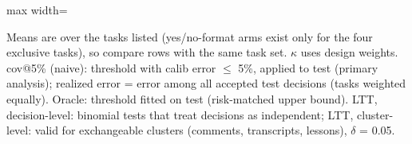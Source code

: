 \begin{table}[t]
\begin{adjustbox}{max width=\linewidth}
\end{adjustbox}
\par\smallskip\footnotesize\raggedright Means are over the tasks listed (yes/no-format arms exist only for the four exclusive tasks), so compare rows with the same task set. $\kappa$ uses design weights. cov@5\% (naive): threshold with calib error $\leq$ 5\%, applied to test (primary analysis); realized error = error among all accepted test decisions (tasks weighted equally). Oracle: threshold fitted on test (risk-matched upper bound). LTT, decision-level: binomial tests that treat decisions as independent; LTT, cluster-level: valid for exchangeable clusters (comments, transcripts, lessons), $\delta$ = 0.05.
\end{table}
